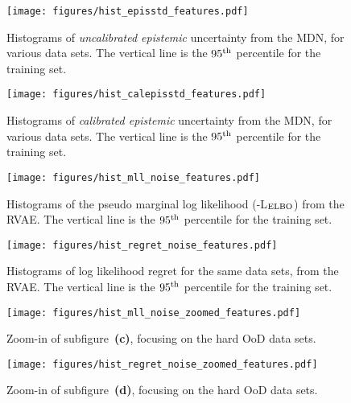 \begin{figure*}
\begin{subfigure}{0.49\textwidth}
    \centering
    \texttt{[image: figures/hist\_episstd\_features.pdf]}
    \caption{Histograms of {\it uncalibrated epistemic} uncertainty from the MDN, for various data sets. The vertical line is the $95^{\rm th}$ percentile for the training set.}
    \label{fig:vae_hist_epis}
\end{subfigure}
\hfill
\begin{subfigure}{0.49\textwidth}
    \centering
    \texttt{[image: figures/hist\_calepisstd\_features.pdf]}
    \caption{Histograms of {\it calibrated epistemic} uncertainty from the MDN, for various data sets. The vertical line is the $95^{\rm th}$ percentile  for the training set.}
    \label{fig:vae_hist_calepis}
\end{subfigure}
\newline
\begin{subfigure}{0.49\textwidth}
    \centering
    \texttt{[image: figures/hist\_mll\_noise\_features.pdf]}
    \caption{Histograms of the pseudo marginal log likelihood (-L$_{\rm ELBO}$) from the RVAE. The vertical line is the $95^{\rm th}$ percentile  for the training set.}
    \label{fig:vae_hist_mll}
\end{subfigure}
\hfill
\begin{subfigure}{0.49\textwidth}
    \centering
    \texttt{[image: figures/hist\_regret\_noise\_features.pdf]}
    \caption{Histograms of log likelihood regret for the same data sets, from the RVAE. The vertical line is the $95^{\rm th}$ percentile  for the training set.}
    \label{fig:vae_hist_regret}
\end{subfigure}
\newline
\begin{subfigure}{0.49\textwidth}
    \centering
    \texttt{[image: figures/hist\_mll\_noise\_zoomed\_features.pdf]}
    \caption{Zoom-in of subfigure~\textbf{(c)}, focusing on the hard OoD data sets.}
    \label{fig:vae_hist_mll_zoomed}
\end{subfigure}
\hfill
\begin{subfigure}{0.49\textwidth}
    \centering
    \texttt{[image: figures/hist\_regret\_noise\_zoomed\_features.pdf]}
    \caption{Zoom-in of subfigure~\textbf{(d)}, focusing on the hard OoD data sets.}
    \label{fig:vae_hist_regret_zoomed}
\end{subfigure}

\end{figure*}
